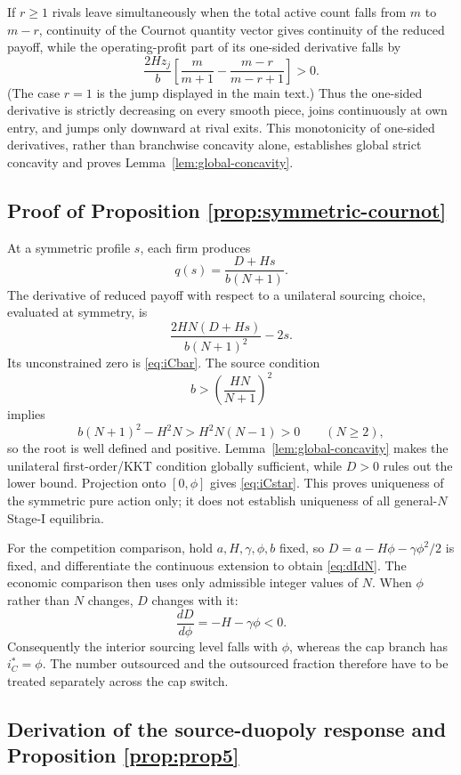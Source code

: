 If \(r\ge1\) rivals leave simultaneously when the total active count falls
from \(m\) to \(m-r\), continuity of the Cournot quantity vector gives
continuity of the reduced payoff, while the operating-profit part of its
one-sided derivative falls by
\[
\frac{2Hz_j}{b}
\left[
\frac{m}{m+1}
-
\frac{m-r}{m-r+1}
\right]
>0.
\]
(The case \(r=1\) is the jump displayed in the main text.)  Thus the
one-sided derivative is strictly decreasing on every smooth piece, joins
continuously at own entry, and jumps only downward at rival exits.  This
monotonicity of one-sided derivatives, rather than branchwise concavity alone,
establishes global strict concavity and proves
Lemma~\ref{lem:global-concavity}.

\subsection{Proof of Proposition \ref{prop:symmetric-cournot}}

At a symmetric profile \(s\), each firm produces
\[
q(s)=\frac{D+Hs}{b(N+1)}.
\]
The derivative of reduced payoff with respect to a unilateral sourcing choice,
evaluated at symmetry, is
\[
\frac{2HN(D+Hs)}{b(N+1)^2}-2s.
\]
Its unconstrained zero is \eqref{eq:iCbar}.  The source condition
\[
b>\left(\frac{HN}{N+1}\right)^2
\]
implies
\[
b(N+1)^2-H^2N
>
H^2N(N-1)>0
\qquad(N\ge2),
\]
so the root is well defined and positive.  Lemma~\ref{lem:global-concavity}
makes the unilateral first-order/KKT condition globally sufficient, while
\(D>0\) rules out the lower bound.  Projection onto \([0,\phi]\) gives
\eqref{eq:iCstar}.  This proves uniqueness of the symmetric pure action only;
it does not establish uniqueness of all general-\(N\) Stage-I equilibria.

For the competition comparison, hold \(a,H,\gamma,\phi,b\) fixed, so
\(D=a-H\phi-\gamma\phi^2/2\) is fixed, and differentiate the continuous
extension to obtain \eqref{eq:dIdN}.  The economic comparison then uses only
admissible integer values of \(N\).  When \(\phi\) rather than \(N\)
changes, \(D\) changes with it:
\[
\frac{dD}{d\phi}=-H-\gamma\phi<0.
\]
Consequently the interior sourcing level falls with \(\phi\), whereas the
cap branch has \(i_C^*=\phi\).  The number outsourced and the outsourced
fraction therefore have to be treated separately across the cap switch.

\subsection{Derivation of the source-duopoly response and Proposition \ref{prop:prop5}}

